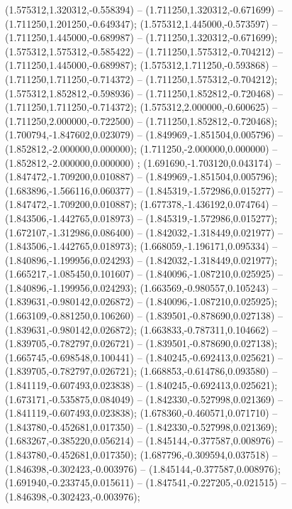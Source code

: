  (1.575312,1.320312,-0.558394) -- (1.711250,1.320312,-0.671699) -- (1.711250,1.201250,-0.649347);
 (1.575312,1.445000,-0.573597) -- (1.711250,1.445000,-0.689987) -- (1.711250,1.320312,-0.671699);
 (1.575312,1.575312,-0.585422) -- (1.711250,1.575312,-0.704212) -- (1.711250,1.445000,-0.689987);
 (1.575312,1.711250,-0.593868) -- (1.711250,1.711250,-0.714372) -- (1.711250,1.575312,-0.704212);
 (1.575312,1.852812,-0.598936) -- (1.711250,1.852812,-0.720468) -- (1.711250,1.711250,-0.714372);
 (1.575312,2.000000,-0.600625) -- (1.711250,2.000000,-0.722500) -- (1.711250,1.852812,-0.720468);
 (1.700794,-1.847602,0.023079) -- (1.849969,-1.851504,0.005796) -- (1.852812,-2.000000,0.000000);
 (1.711250,-2.000000,0.000000) -- (1.852812,-2.000000,0.000000) ;
 (1.691690,-1.703120,0.043174) -- (1.847472,-1.709200,0.010887) -- (1.849969,-1.851504,0.005796);
 (1.683896,-1.566116,0.060377) -- (1.845319,-1.572986,0.015277) -- (1.847472,-1.709200,0.010887);
 (1.677378,-1.436192,0.074764) -- (1.843506,-1.442765,0.018973) -- (1.845319,-1.572986,0.015277);
 (1.672107,-1.312986,0.086400) -- (1.842032,-1.318449,0.021977) -- (1.843506,-1.442765,0.018973);
 (1.668059,-1.196171,0.095334) -- (1.840896,-1.199956,0.024293) -- (1.842032,-1.318449,0.021977);
 (1.665217,-1.085450,0.101607) -- (1.840096,-1.087210,0.025925) -- (1.840896,-1.199956,0.024293);
 (1.663569,-0.980557,0.105243) -- (1.839631,-0.980142,0.026872) -- (1.840096,-1.087210,0.025925);
 (1.663109,-0.881250,0.106260) -- (1.839501,-0.878690,0.027138) -- (1.839631,-0.980142,0.026872);
 (1.663833,-0.787311,0.104662) -- (1.839705,-0.782797,0.026721) -- (1.839501,-0.878690,0.027138);
 (1.665745,-0.698548,0.100441) -- (1.840245,-0.692413,0.025621) -- (1.839705,-0.782797,0.026721);
 (1.668853,-0.614786,0.093580) -- (1.841119,-0.607493,0.023838) -- (1.840245,-0.692413,0.025621);
 (1.673171,-0.535875,0.084049) -- (1.842330,-0.527998,0.021369) -- (1.841119,-0.607493,0.023838);
 (1.678360,-0.460571,0.071710) -- (1.843780,-0.452681,0.017350) -- (1.842330,-0.527998,0.021369);
 (1.683267,-0.385220,0.056214) -- (1.845144,-0.377587,0.008976) -- (1.843780,-0.452681,0.017350);
 (1.687796,-0.309594,0.037518) -- (1.846398,-0.302423,-0.003976) -- (1.845144,-0.377587,0.008976);
 (1.691940,-0.233745,0.015611) -- (1.847541,-0.227205,-0.021515) -- (1.846398,-0.302423,-0.003976);
